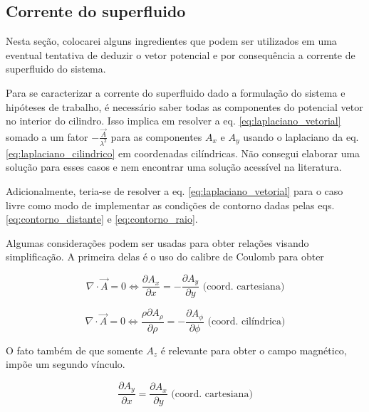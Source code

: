 \documentclass[%
 reprint,
 amsmath,amssymb,
 aps,
]{revtex4-1}
\begin{document}
\subsection{Corrente do superfluido}


Nesta seção, colocarei alguns ingredientes que podem ser utilizados em uma eventual tentativa de deduzir o vetor potencial e por consequência a corrente de superfluido do sistema.

Para se caracterizar a corrente do superfluido dado a formulação do sistema e hipóteses de trabalho, é necessário saber todas as componentes do potencial vetor no interior do cilindro. Isso implica em resolver a eq. \ref{eq:laplaciano_vetorial} somado a um fator $-\frac{\vec{A}}{\lambda^2}$ para as componentes $A_x$ e $A_y$ usando o laplaciano da eq. \ref{eq:laplaciano_cilindrico} em coordenadas cilíndricas. Não consegui elaborar uma solução para esses casos e nem encontrar uma solução acessível na literatura.

Adicionalmente, teria-se de resolver a eq. \ref{eq:laplaciano_vetorial} para o caso livre como modo de implementar as condições de contorno dadas pelas eqs. \ref{eq:contorno_distante} e \ref{eq:contorno_raio}.

Algumas considerações podem ser usadas para obter relações visando simplificação. A primeira delas é o uso do calibre de Coulomb para obter

\begin{equation}
\label{eq:superfluido_calibre_cartesiano}
    \nabla \cdot \vec{A} = 0 \Leftrightarrow \frac{\partial A_x}{\partial x} = - \frac{\partial A_y}{\partial y} \mbox{ (coord. cartesiana)}
\end{equation}

\begin{equation}
    \label{eq:superfluido_calibre_cilindrico}
    \nabla \cdot \vec{A} = 0 \Leftrightarrow \frac{\rho \partial A_{\rho}}{\partial \rho} = - \frac{\partial A_\phi}{\partial \phi} \mbox{ (coord. cilíndrica)}
\end{equation}

O fato também de que somente $A_z$ é relevante para obter o campo magnético, impõe um segundo vínculo.

\begin{equation}
    \label{eq:superfluido_campo}
    \frac{\partial A_y}{\partial {x}} = \frac{\partial A_{x}}{\partial y}
     \mbox{ (coord. cartesiana)}
\end{equation}
\end{document}
